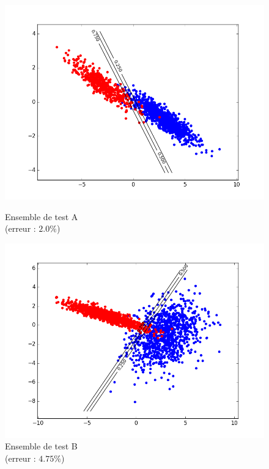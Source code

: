 \documentclass[paper=a4, fontsize=11pt]{article}
\begin{document}
\begin{figure}[h]
 \begin{minipage}[b]{.3\linewidth}
 \begin{center}
 \includegraphics[scale=0.25]{figures/LDA_A_test.png}
  \caption*{Ensemble de test A \\ (erreur : $2.0\%$)}
 \end{center}
 \end{minipage} \hfill
 \begin{minipage}[b]{.3\linewidth}
  \includegraphics[scale=0.25]{figures/LDA_B_test.png}
  \caption*{Ensemble de test B \\ (erreur : $4.75\%$)}
 \end{minipage} \hfill

\end{figure}
\end{document}
